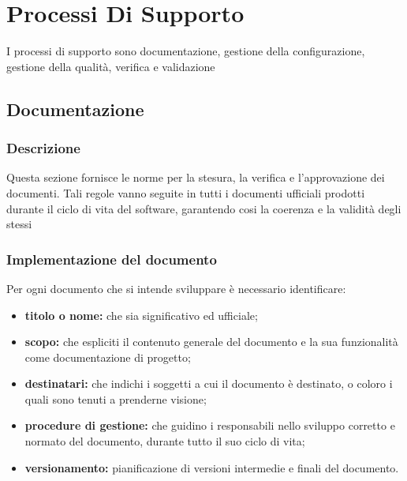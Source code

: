 \chapter{Processi Di Supporto}
I processi di supporto sono documentazione, gestione della configurazione, gestione della qualità, verifica e validazione
\section{Documentazione}
\subsection{Descrizione}
Questa sezione fornisce le norme per la stesura, la verifica e l'approvazione dei documenti. Tali regole vanno seguite in tutti i documenti ufficiali prodotti durante il ciclo di vita del software, garantendo cosi la coerenza e la validità degli stessi
\subsection{Implementazione del documento}
 Per ogni documento che si intende sviluppare è necessario identificare:
\begin{itemize}
\item \textbf {titolo o nome:} che sia significativo ed ufficiale; 
	\item \textbf {scopo:} che espliciti il contenuto generale del documento e la sua funzionalità come 		documentazione di progetto; 
		\item \textbf {destinatari:} che indichi i soggetti a cui il documento è destinato, o coloro i quali sono tenuti a prenderne visione; 
			\item \textbf {procedure di gestione:} che guidino i responsabili nello sviluppo corretto e normato del documento, durante tutto il suo ciclo di vita; 
				\item \textbf {versionamento:} pianificazione di versioni intermedie e finali del documento. 
\end{itemize} 
